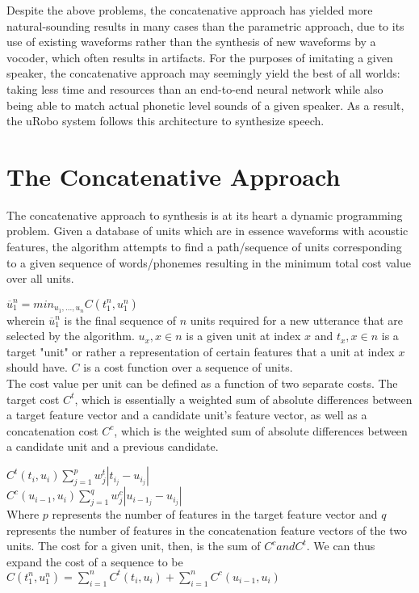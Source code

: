 \documentclass[10pt,a4paper,twocolumn]{article}
\begin{document}
Despite the above problems, the concatenative approach has yielded more natural-sounding results in many cases than the parametric approach, due to its use of existing waveforms rather than the synthesis of new waveforms by a vocoder, which often results in artifacts. For the purposes of imitating a given speaker, the concatenative approach may seemingly yield the best of all worlds: taking less time and resources than an end-to-end neural network while also being able to match actual phonetic level sounds of a given speaker. As a result, the uRobo system follows this architecture to synthesize speech.  
\section{The Concatenative Approach}
The concatenative approach to synthesis is at its heart a dynamic programming problem. Given a database of units which are in essence waveforms with acoustic features, the algorithm attempts to find a path/sequence of units corresponding to a given sequence of words/phonemes resulting in the minimum total cost value over all units. \par
$\overline{u}_1^n=min_{u_1,...,u_n}C(t_1^n,u_1^n)$\\
wherein $\overline{u}_1^n$ is the final sequence of $n$ units required for a new utterance that are selected by the algorithm. $u_x, x\in n$ is a given unit at index $x$ and $t_x, x\in n$ is a target "unit" or rather a representation of certain features that a unit at index $x$ should have. $C$ is a cost function over a sequence of units.\\	
The cost value per unit can be defined as a function of two separate costs. The target cost $C^t$, which is essentially a weighted sum of absolute differences between a target feature vector and a candidate unit's feature vector, as well as a concatenation cost $C^c$, which is the weighted sum of absolute differences between a candidate unit and a previous candidate.\par
$C^t(t_i,u_i)\sum_{j=1}^pw_j^t|t_{i_j}-u_{i_j}|$\\
$C^c(u_{i-1},u_i)\sum_{j=1}^qw_j^c|u_{i-1_j}-u_{i_j}|$\\
Where $p$ represents the number of features in the target feature vector and $q$ represents the number of features in the concatenation feature vectors of the two units. The cost for a given unit, then, is the sum of $C^c and C^t$. We can thus expand the cost of a sequence to be\\
$C(t_1^n,u_1^n)=\sum_{i=1}^nC^t(t_i,u_i)+ \sum_{i=1}^nC^c(u_{i-1},u_i)$
\end{document}
